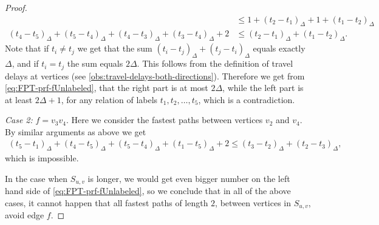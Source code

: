 \documentclass[a4paper,UKenglish,cleveref, autoref, thm-restate]{lipics-v2021}
\begin{document}
\begin{proof}
\begin{equation}
\begin{split}
        &\leq 
        1 + (t_2 - t_1)_\Delta + 
        1 + (t_1 - t_2)_\Delta\\
        (t_4 - t_5)_\Delta + (t_5 - t_4)_\Delta +
        (t_4 - t_3)_\Delta + (t_3 - t_4)_\Delta  + 2 
        &\leq 
        (t_2 - t_1)_\Delta + (t_1 - t_2)_\Delta.
    \end{split}
    \end{equation}
    Note that if $t_i \neq t_j$ we get that 
    the sum
    $(t_i - t_j)_\Delta + (t_j - t_i)_\Delta$ equals exactly $\Delta$,
    and if $t_i = t_j$ the sum equals $2\Delta$.
    This follows from the definition of travel delays at vertices (see \cref{obs:travel-delays-both-directions}).
    Therefore we get from \cref{eq:FPT-prf-fUnlabeled}, 
    that the right part is at most $2 \Delta$, while the left part is at least $2 \Delta + 1$,
    for any relation of labels $t_1,t_2, \dots, t_5$,
    which is a contradiction.

    \emph{Case 2: }$f = v_3v_4$.
    Here we consider the fastest paths between vertices $v_{2}$ and $v_{4}$.
    By similar arguments as above we get
    \begin{align*}
        (t_5 - t_1)_\Delta + (t_4 - t_5)_\Delta + (t_5 - t_4)_\Delta + (t_1 - t_5)_\Delta + 2 \leq (t_3 - t_2)_\Delta + (t_2 - t_3)_\Delta,
    \end{align*}
    which is impossible.
    
    In the case when $S_{u,v}$ is longer, we would get even bigger number on the left hand side of \cref{eq:FPT-prf-fUnlabeled}, 
    so we conclude that in all of the above cases, it cannot happen that all fastest paths of length $2$, between vertices in $S_{u,v}$, avoid edge $f$.


\end{proof}
\end{document}
